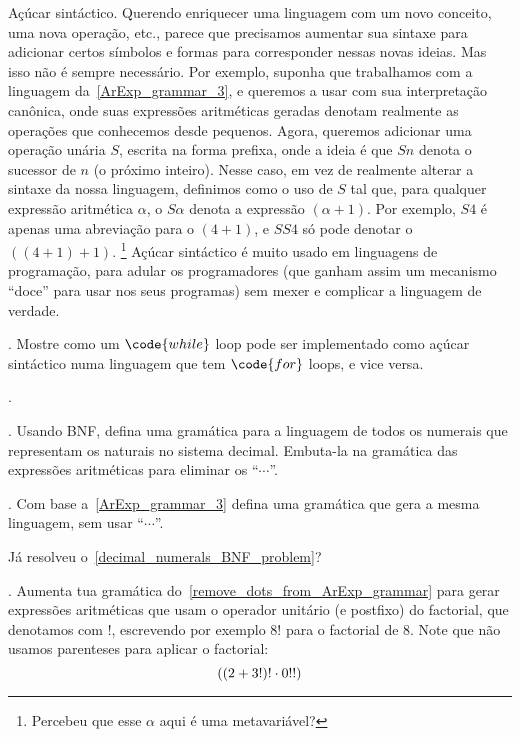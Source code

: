 \note Açúcar sintáctico.
%
Querendo enriquecer uma linguagem com um novo conceito, uma nova operação,
etc., parece que precisamos aumentar sua sintaxe para adicionar certos
símbolos e formas para corresponder nessas novas ideias.
Mas isso não é sempre necessário.
Por exemplo, suponha que trabalhamos com a linguagem da~\ref{ArExp_grammar_3},
e queremos a usar com sua interpretação canônica, onde suas expressões aritméticas
geradas denotam realmente as operações que conhecemos desde pequenos.
Agora, queremos adicionar uma operação unária $S$, escrita na forma prefixa,
onde a ideia é que $Sn$ denota o sucessor de $n$ (o próximo inteiro).
Nesse caso, em vez de realmente alterar a sintaxe da nossa linguagem,
definimos como  o uso de $S$ tal que, para qualquer
expressão aritmética $\alpha$, o $S\alpha$ denota a expressão $(\alpha + 1)$.
Por exemplo, $S4$ é apenas uma abreviação para o $(4 + 1)$,
e $SS4$ só pode denotar o $((4 + 1) + 1)$.%
\footnote{Percebeu que esse $\alpha$ aqui é uma metavariável?}
Açúcar sintáctico é muito usado em linguagens de programação,
para adular os programadores (que ganham assim um mecanismo
``doce'' para usar nos seus programas) sem mexer e complicar
a linguagem de verdade.

\exercise.
\label{for_while_sugar}%
Mostre como um $\code{while}$ loop pode ser implementado como
açúcar sintáctico numa linguagem que tem $\code{for}$ loops,
e vice versa.

\endexercise

\endsection

\problems.

\problem.
\label{decimal_numerals_BNF_problem}%
Usando BNF, defina uma gramática para a linguagem de todos os
numerais que representam os naturais no sistema decimal.
Embuta-la na gramática das expressões aritméticas
para eliminar os ``$\dotsb$''.

\endproblem

\problem.
\label{remove_dots_from_ArExp_grammar}%
Com base a~\ref{ArExp_grammar_3} defina uma gramática que gera a mesma linguagem,
sem usar ``$\dotsb$''.

\hint
Já resolveu o~\ref{decimal_numerals_BNF_problem}?

\endproblem

\problem.
\label{ArExp_with_factorial}%
Aumenta tua gramática do~\ref{remove_dots_from_ArExp_grammar} para
gerar expressões aritméticas que usam o operador unitário (e postfixo)
do factorial, que denotamos com $!$, escrevendo por exemplo
$8!$ para o factorial de $8$.
Note que não usamos parenteses para aplicar o factorial:
$$
((2 + 3!)! \mathbin{\cdot} 0!!)
$$


